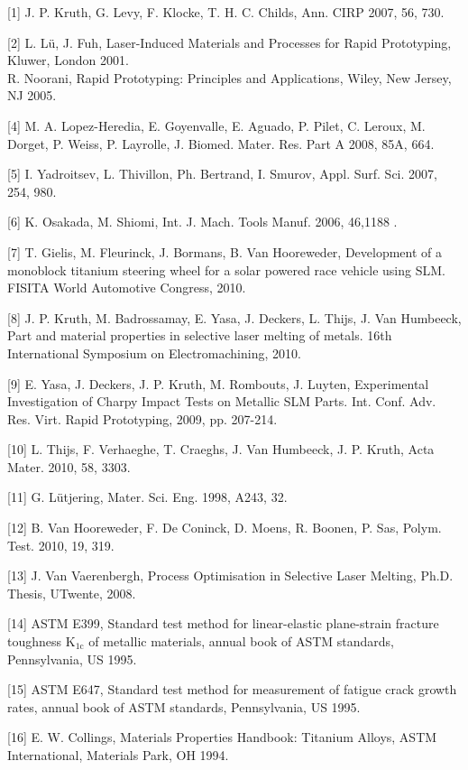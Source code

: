 \documentclass[10pt]{article}
\begin{document}
[1] J. P. Kruth, G. Levy, F. Klocke, T. H. C. Childs, Ann. CIRP 2007, 56, 730.

[2] L. Lü, J. Fuh, Laser-Induced Materials and Processes for Rapid Prototyping, Kluwer, London 2001.\\
[3] R. Noorani, Rapid Prototyping: Principles and Applications, Wiley, New Jersey, NJ 2005.

[4] M. A. Lopez-Heredia, E. Goyenvalle, E. Aguado, P. Pilet, C. Leroux, M. Dorget, P. Weiss, P. Layrolle, J. Biomed. Mater. Res. Part A 2008, 85A, 664.

[5] I. Yadroitsev, L. Thivillon, Ph. Bertrand, I. Smurov, Appl. Surf. Sci. 2007, 254, 980.

[6] K. Osakada, M. Shiomi, Int. J. Mach. Tools Manuf. 2006, 46,1188 .

[7] T. Gielis, M. Fleurinck, J. Bormans, B. Van Hooreweder, Development of a monoblock titanium steering wheel for a solar powered race vehicle using SLM. FISITA World Automotive Congress, 2010.

[8] J. P. Kruth, M. Badrossamay, E. Yasa, J. Deckers, L. Thijs, J. Van Humbeeck, Part and material properties in selective laser melting of metals. 16th International Symposium on Electromachining, 2010.

[9] E. Yasa, J. Deckers, J. P. Kruth, M. Rombouts, J. Luyten, Experimental Investigation of Charpy Impact Tests on Metallic SLM Parts. Int. Conf. Adv. Res. Virt. Rapid Prototyping, 2009, pp. 207-214.

[10] L. Thijs, F. Verhaeghe, T. Craeghs, J. Van Humbeeck, J. P. Kruth, Acta Mater. 2010, 58, 3303.

[11] G. Lütjering, Mater. Sci. Eng. 1998, A243, 32.

[12] B. Van Hooreweder, F. De Coninck, D. Moens, R. Boonen, P. Sas, Polym. Test. 2010, 19, 319.

[13] J. Van Vaerenbergh, Process Optimisation in Selective Laser Melting, Ph.D. Thesis, UTwente, 2008.

[14] ASTM E399, Standard test method for linear-elastic plane-strain fracture toughness $\mathrm{K}_{1 \mathrm{c}}$ of metallic materials, annual book of ASTM standards, Pennsylvania, US 1995.

[15] ASTM E647, Standard test method for measurement of fatigue crack growth rates, annual book of ASTM standards, Pennsylvania, US 1995.

[16] E. W. Collings, Materials Properties Handbook: Titanium Alloys, ASTM International, Materials Park, $\mathrm{OH}$ 1994.
\end{document}
